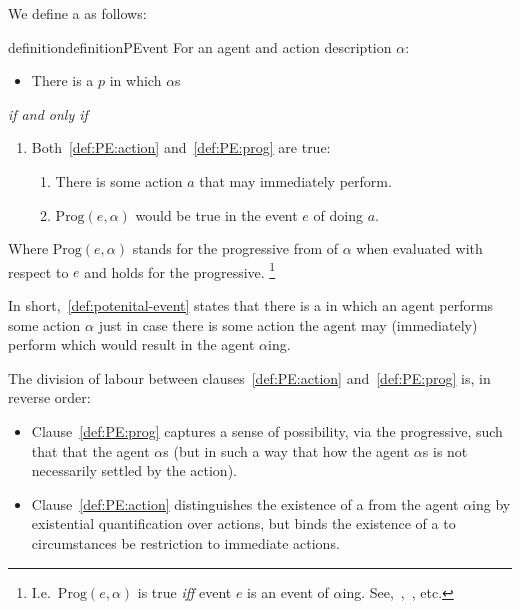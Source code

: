 \begin{note}
  We define a \pevent{} as follows:
  \begin{restatable}[\pevent{3}]{definition}{definitionPEvent}
    \label{def:potenital-event}
    For an agent \vAgent{} and action description \(\alpha\):
    \begin{itemize}
    \item
      There is a \pevent{} \(p\) in which \vAgent{} \(\alpha\)s
    \end{itemize}
    \emph{if and only if}
    \begin{enumerate}[label=]
    \item
      Both~\ref{def:PE:action} and~\ref{def:PE:prog} are true:
      \begin{enumerate}[label=\alph*., ref=(\alph*)]
      \item
        \label{def:PE:action}
        There is some action \(a\) that \vAgent{} may immediately perform.
      \item
        \label{def:PE:prog}
        \(\text{Prog}(e, \alpha)\) would be true in the event \(e\) of \vAgent{} doing \(a\).
      \end{enumerate}
    \end{enumerate}
    Where \(\text{Prog}(e, \alpha)\) stands for the progressive from of \(\alpha\) when evaluated with respect to \(e\) and \assuPP{} holds for the progressive.%
    \footnote{
      I.e.\ \(\text{Prog}(e, \alpha)\) is true \emph{iff} event \(e\) is an event of \(\alpha\)ing.
      See,~\textcite{Richards:1981wo},~\textcite{Portner:2011vi}, etc.
    }
  \end{restatable}

  In short,~\autoref{def:potenital-event} states that there is a \pevent{} in which an agent performs some action \(\alpha\) just in case there is some action the agent may (immediately) perform which would result in the agent \(\alpha\)ing.
\end{note}

\begin{note}
  The division of labour between clauses~\ref{def:PE:action} and~\ref{def:PE:prog} is, in reverse order:
  \begin{itemize}[noitemsep]
  \item
    Clause~\ref{def:PE:prog} captures a sense of possibility, via the progressive, such that that the agent \(\alpha\)s (but in such a way that how the agent \(\alpha\)s is not necessarily settled by the action).
\item
  Clause~\ref{def:PE:action} distinguishes the existence of a \pevent{} from the agent \(\alpha\)ing by existential quantification over actions, but binds the existence of a \pevent{} to circumstances be restriction to immediate actions.
  \end{itemize}
\end{note}

